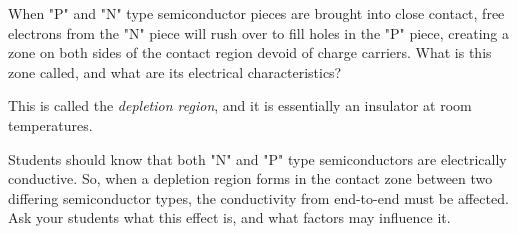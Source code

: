 

When "P" and "N" type semiconductor pieces are brought into close contact, free electrons from the "N" piece will rush over to fill holes in the "P" piece, creating a zone on both sides of the contact region devoid of charge carriers.  What is this zone called, and what are its electrical characteristics?







This is called the {\it depletion region}, and it is essentially an insulator at room temperatures.







Students should know that both "N" and "P" type semiconductors are electrically conductive.  So, when a depletion region forms in the contact zone between two differing semiconductor types, the conductivity from end-to-end must be affected.  Ask your students what this effect is, and what factors may influence it.




